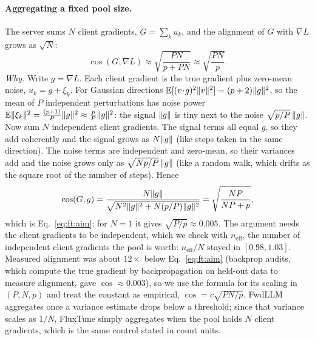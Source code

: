 \paragraph{Aggregating a fixed pool size.}\label{sec:ft:pool}
The server sums $N$ client gradients, $G=\sum_k u_k$, and the alignment of $G$ with $\nabla L$ grows as $\sqrt N$:
\begin{equation}
\cos(G,\nabla L)\approx\sqrt{\frac{PN}{p+PN}}\approx\sqrt{\frac{PN}{p}} .
\label{eq:ft:aim}
\end{equation}
\emph{Why.} Write $g=\nabla L$. Each client gradient is the true gradient plus zero-mean noise, $u_k=g+\xi_k$. For Gaussian directions $\mathbb{E}[(v\!\cdot\! g)^2\lVert v\rVert^2]=(p+2)\lVert g\rVert^2$, so
the mean of $P$ independent perturbations has noise power $\mathbb{E}\lVert \xi_k\rVert^2=\frac{(p+1)}{P}\lVert g\rVert^2\approx\frac pP\lVert g\rVert^2$: the signal $\lVert g\rVert$ is tiny next to the noise $\sqrt{p/P}\,\lVert g\rVert$.
Now sum $N$ independent client gradients. The signal terms all equal $g$, so they add coherently and the signal grows as $N\lVert g\rVert$ (like steps taken in the same direction).
The noise terms are independent and zero-mean, so their variances add and the noise grows only as $\sqrt{Np/P}\,\lVert g\rVert$ (like a random walk, which drifts as the square root of the number of steps). Hence
\[
\cos(G,g)=\frac{N\lVert g\rVert}{\sqrt{N^2\lVert g\rVert^2+N(p/P)\lVert g\rVert^2}}=\sqrt{\frac{NP}{NP+p}} ,
\]
which is Eq.~\eqref{eq:ft:aim}; for $N=1$ it gives $\sqrt{P/p}\approx0.005$. The argument needs the client gradients to be independent, which we check with $n_{\mathrm{eff}}$, the number of independent client gradients the pool is worth:
$n_{\mathrm{eff}}/N$ stayed in $[0.98,1.03]$. Measured alignment was about $12\times$ below Eq.~\eqref{eq:ft:aim} (backprop audits, which compute the true gradient by backpropagation on held-out data to measure alignment, gave $\cos\approx0.003$), so we use the formula for its scaling in $(P,N,p)$
and treat the constant as empirical, $\cos=c\sqrt{PN/p}$.
FwdLLM aggregates once a variance estimate drops below a threshold; since that variance scales as $1/N$, FluxTune simply aggregates when the pool holds $N$ client gradients, which is the same control stated in count units.

